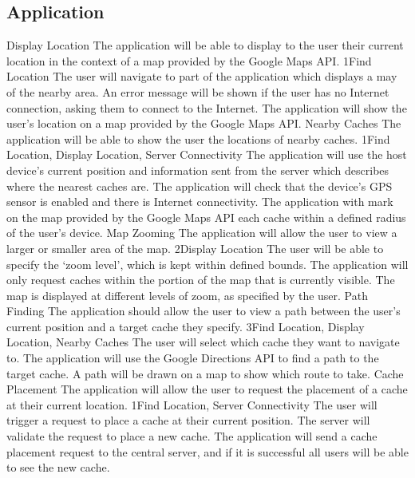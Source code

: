 	\subsection{Application}
		\funcreq
			{Display Location}
			{The application will be able to display to the user their current 
			location in the context of a map provided by the Google Maps API.}
			{1}{Find Location}
			{The user will navigate to part of the application which displays 
			a may of the nearby area.}
			{An error message will be shown if the user has no Internet 
			connection, asking them to connect to the Internet.}
			{The application will show the user's location on a map provided 
			by the Google Maps API.}
		\funcreq
			{Nearby Caches}
			{The application will be able to show the user the locations of 
			nearby caches.}
			{1}{Find Location, Display Location, Server Connectivity}
			{The application will use the host device's current position and 
			information sent from the server which describes where the nearest 
			caches are.}
			{The application will check that the device's GPS sensor is 
			enabled and there is Internet connectivity.}
			{The application with mark on the map provided by the Google Maps 
			API each cache within a defined radius of the user's device.}
		\funcreq
			{Map Zooming}
			{The application will allow the user to view a larger or smaller 
			area of the map.}
			{2}{Display Location}
			{The user will be able to specify the `zoom level', which is kept 
			within defined bounds.}
			{The application will only request caches within the portion of 
			the map that is currently visible.}
			{The map is displayed at different levels of zoom, as specified by 
			the user.}
		\funcreq
			{Path Finding}
			{The application should allow the user to view a path between the 
			user's current position and a target cache they specify.}
			{3}{Find Location, Display Location, Nearby Caches}
			{The user will select which cache they want to navigate to.}
			{The application will use the Google Directions API to find a path 
			to the target cache.}
			{A path will be drawn on a map to show which route to take.}
		\funcreq
			{Cache Placement}
			{The application will allow the user to request the placement of a 
			cache at their current location.}
			{1}{Find Location, Server Connectivity}
			{The user will trigger a request to place a cache at their current 
			position.}
			{The server will validate the request to place a new cache.}
			{The application will send a cache placement request to the 
			central server, and if it is successful all users will be able to 
			see the new cache.}
